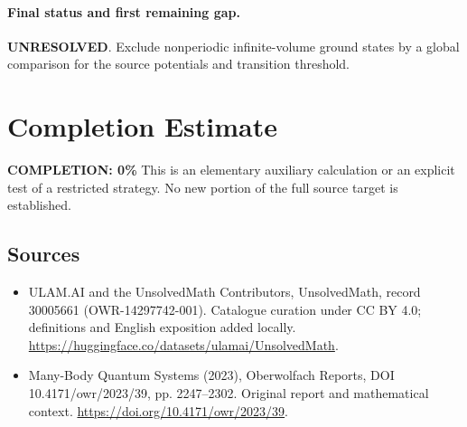 \documentclass[11pt]{article}
\begin{document}
\paragraph{Final status and first remaining gap.}
\textbf{UNRESOLVED}. Exclude nonperiodic infinite-volume ground states by a global comparison for the source potentials and transition threshold.

\section{Completion Estimate}
\noindent\textbf{COMPLETION: 0\%}
This is an elementary auxiliary calculation or an explicit test of a restricted strategy. No new portion of the full source target is established.

\subsection{Sources}
\begin{itemize}
\item[\hypertarget{source:30005661:1}{S1}] ULAM.AI and the UnsolvedMath Contributors, UnsolvedMath, record 30005661 (OWR-14297742-001). Catalogue curation under CC BY 4.0; definitions and English exposition added locally.
\url{https://huggingface.co/datasets/ulamai/UnsolvedMath}.
\item[\hypertarget{source:30005661:2}{S2}] Many-Body Quantum Systems (2023), Oberwolfach Reports, DOI 10.4171/owr/2023/39, pp. 2247--2302. Original report and mathematical context.
\url{https://doi.org/10.4171/owr/2023/39}.
\end{itemize}
\label{end:30005661}
\end{document}
